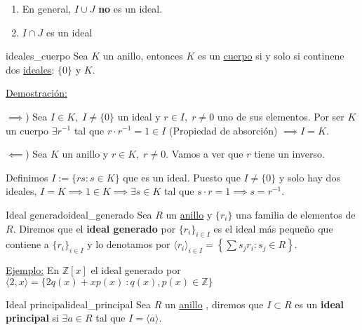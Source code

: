 \documentclass[10pt, a4paper]{article}
\newcommand{\Z}{\mathbb{Z}}
\newcommand{\ej}{\underline{Ejemplo:} }
\newcommand{\demo}{\underline{Demostración:} }
\newcommand{\anillo}[1][]{\hyperref[def:anillo]{anillo}#1 }
\newenvironment{enumerater}{\begin{enumerate}[label=\roman*)]}
{\end{enumerate}}
\begin{document}
\begin{enumerater}
	\item En general, $I \cup J$ \textbf{no} es un ideal.
	\item $I \cap J$ es un ideal
\end{enumerater}

\begin{proposition}{}{ideales_cuerpo}
Sea $K$ un anillo, entonces $K$ es un \hyperref[def:cuerpo]{cuerpo} si y solo si continene dos \hyperref[def:ideal]{ideales}: $\{0\}$ y $K$.
\end{proposition}

\demo 

$\implies$) Sea $I \in K, \; I \neq \{0\}$ un ideal y $r \in I, \; r \neq 0$ uno de sus elementos. Por ser $K$ un cuerpo $\exists r^{-1}$ tal que $r \cdot r^{-1} = 1 \in I$ (Propiedad de absorción) $\implies I = K$.

$\impliedby$) Sea $K$ un anillo y $r \in K, \; r \neq 0$. Vamos a ver que $r$ tiene un inverso.

Definimos $I := \{rs : s \in K\}$ que es un ideal. Puesto que $I \neq \{0\}$ y solo hay dos ideales, $I = K \implies 1 \in K \implies \exists s \in K$ tal que $s \cdot r = 1 \implies s = r^{-1}$.

\begin{definition}{Ideal generado}{ideal_generado}
Sea $R$ un \anillo y $\{r_i\}$ una familia de elementos de $R$. Diremos que el \textbf{ideal generado} por $\{r_i\}_{i \in I}$ es el ideal más pequeño que contiene a $\{r_i\}_{i \in I}$ y lo denotamos por $\langle r_i \rangle_{i \in I} = \left \{ \displaystyle\sum s_j r_i : s_j \in R \right \}$.
\end{definition}

\ej En $\Z[x]$ el ideal generado por $\langle 2, x \rangle = \{2q(x) + xp(x)\ : q(x), p(x) \in \Z\}$

\begin{definition}{Ideal principal}{ideal_principal}
Sea $R$ un \anillo, diremos que $I \subset R$ es un \textbf{ideal principal} si $\exists a \in R$ tal que $I = \langle a \rangle$.
\end{definition}
\end{document}
